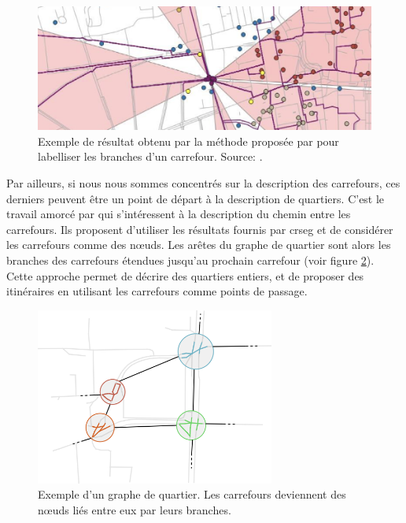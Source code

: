 \begin{figure}[ht]
    \centering
    \includegraphics[width=\textwidth]{images/conclusion/stage_ali.png}
    \caption[Labellisation des branches d'un carrefour]{Exemple de résultat obtenu par la méthode proposée par \citet{aouini2023} pour labelliser les branches d'un carrefour. Source: \citep{aouini2023}.}
    \label{fig:conclusion_exemple_ali}
\end{figure}

\newpar{}

Par ailleurs, si nous nous sommes concentrés sur la description des carrefours, ces derniers peuvent être un point de départ à la description de quartiers. C'est le travail amorcé par \citet{guillaumin2023} qui s'intéressent à la description du chemin entre les carrefours. Ils proposent d'utiliser les résultats fournis par crseg et de considérer les carrefours comme des nœuds. Les arêtes du graphe de quartier sont alors les branches des carrefours étendues jusqu'au prochain carrefour (voir figure \ref{fig:conclusion_exemple_chemin_carrefour}). Cette approche permet de décrire des quartiers entiers, et de proposer des itinéraires en utilisant les carrefours comme points de passage.

\begin{figure}[ht]
    \centering
    \includegraphics[width=0.7\textwidth]{images/conclusion/chemin_carrefour.png}
    \caption[Graphe de quartier]{Exemple d'un graphe de quartier. Les carrefours deviennent des nœuds liés entre eux par leurs branches.}
    \label{fig:conclusion_exemple_chemin_carrefour}
\end{figure}


